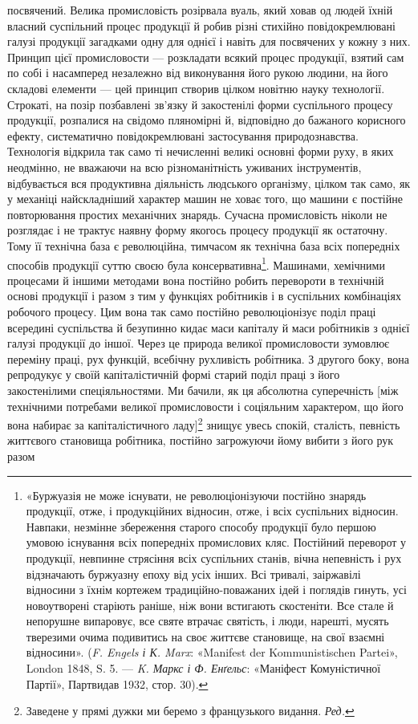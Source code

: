 \parcont{}  %
посвячений. Велика промисловість розірвала вуаль, який ховав
од людей їхній власний суспільний процес продукції й робив
різні стихійно повідокремлювані галузі продукції загадками
одну для однієї і навіть для посвячених у кожну з них. Принцип
цієї промисловости — розкладати всякий процес продукції, взятий
сам по собі і насамперед незалежно від виконування його
рукою людини, на його складові елементи — цей принцип створив
цілком новітню науку технології. Строкаті, на позір позбавлені
зв’язку й закостенілі форми суспільного процесу продукції,
розпалися на свідомо пляномірні й, відповідно до бажаного корисного
ефекту, систематично повідокремлювані застосування
природознавства. Технологія відкрила так само ті нечисленні
великі основні форми руху, в яких неодмінно, не вважаючи на
всю різноманітність уживаних інструментів, відбувається вся
продуктивна діяльність людського організму, цілком так само,
як у механіці найскладніший характер машин не ховає того,
що машини є постійне повторювання простих механічних знарядь.
Сучасна промисловість ніколи не розглядає і не трактує наявну
форму якогось процесу продукції як остаточну. Тому її технічна
база є революційна, тимчасом як технічна база всіх попередніх
способів продукції суттю своєю була консервативна\footnote{
«Буржуазія не може існувати, не революціонізуючи постійно
знарядь продукції, отже, і продукційних відносин, отже, і всіх суспільних
відносин. Навпаки, незмінне збереження старого способу продукції було
першою умовою існування всіх попередніх промислових кляс. Постійний
переворот у продукції, невпинне стрясіння всіх суспільних станів, вічна
непевність і рух відзначають буржуазну епоху від усіх інших. Всі тривалі,
заіржавілі відносини з їхнім кортежем традиційно-поважаних ідей і
поглядів гинуть, усі новоутворені старіють раніше, ніж вони встигають
скостеніти. Все стале й непорушне випаровує, все святе втрачає святість,
і люди, нарешті, мусять тверезими очима подивитись на своє життєве
становище, на свої взаємні відносини». (\emph{F. Engels і К. Marx}: «Manifest
der Kommunistischen Partei», London 1848, S. 5. — \emph{K. Маркс
і Ф. Енґельс}: «Маніфест Комуністичної Партії», Партвидав 1932, стор. 30).
}. Машинами, хемічними процесами й іншими методами вона постійно
робить перевороти в технічній основі продукції і разом з тим
у функціях робітників і в суспільних комбінаціях робочого процесу.
Цим вона так само постійно революціонізує поділ праці
всередині суспільства й безупинно кидає маси капіталу й маси
робітників з однієї галузі продукції до іншої. Через це природа
великої промисловости зумовлює переміну праці, рух функцій,
всебічну рухливість робітника. З другого боку, вона репродукує
у своїй капіталістичній формі старий поділ праці з його закостенілими
спеціяльностями. Ми бачили, як ця абсолютна суперечність
[між технічними потребами великої промисловости і соціяльним
характером, що його вона набирає за капіталістичного ладу]\footnote*{
Заведене у прямі дужки ми беремо з французького видання. \emph{Ред.}
}
знищує увесь спокій, сталість, певність життєвого становища
робітника, постійно загрожуючи йому вибити з його рук разом
\parbreak{}  %
